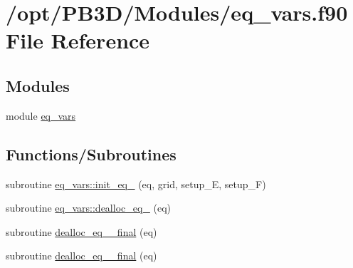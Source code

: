 \hypertarget{eq__vars_8f90}{}\section{/opt/\+P\+B3\+D/\+Modules/eq\+\_\+vars.f90 File Reference}
\label{eq__vars_8f90}
\subsection*{Modules}
\begin{DoxyCompactItemize}
\item 
module \hyperlink{namespaceeq__vars}{eq\+\_\+vars}
\end{DoxyCompactItemize}
\subsection*{Functions/\+Subroutines}
\begin{DoxyCompactItemize}
\item 
subroutine \hyperlink{namespaceeq__vars_a93947b772250ef73b25bde7688b33bc2}{eq\+\_\+vars\+::init\+\_\+eq\+\_} (eq, grid, setup\+\_\+E, setup\+\_\+F)
\item 
subroutine \hyperlink{namespaceeq__vars_ab106dc007ddc896092d0464233b3ce12}{eq\+\_\+vars\+::dealloc\+\_\+eq\+\_} (eq)
\item 
subroutine \hyperlink{eq__vars_8f90_aeb2dafd97b9ec2443da5f6de043d56ff}{dealloc\+\_\+eq\+\_\+\_\+final} (eq)
\item 
subroutine \hyperlink{eq__vars_8f90_a0485e4116f0b0004f9a06ed86ac624aa}{dealloc\+\_\+eq\+\_\+\_\+final} (eq)
\end{DoxyCompactItemize}
